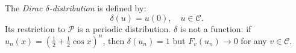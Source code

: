 The \textit{Dirac $\delta$-distribution} is defined by:
\[
\delta(u) = u(0), \quad u \in \mathcal{C}.
\]
Its restriction to $\mathcal{P}$ is a periodic distribution. $\delta$ is not a function: if $u_n(x) = (\frac{1}{2} + \frac{1}{2}\cos x)^n$, then $\delta(u_n) = 1$ but $F_v(u_n) \to 0$ for any $v \in \mathcal{C}$.
